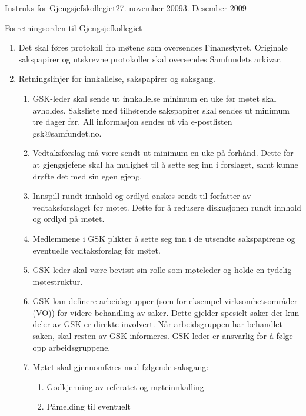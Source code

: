 \begin{instruks}{Instruks for Gjengsjefskollegiet}{27. november 2009}{3. Desember 2009}
\begin{instruksledd}{Forretningsorden til Gjengsjefkollegiet}
\begin{enumerate}
            \item Det skal føres protokoll fra møtene som oversendes Finansstyret. Originale
                sakspapirer og utskrevne
                protokoller skal oversendes Samfundets arkivar.
            \item Retningslinjer for innkallelse, sakspapirer og saksgang.
                \begin{enumerate}
                    \item GSK-leder skal sende ut innkallelse minimum en uke før møtet skal
                        avholdes. Saksliste med tilhørende
                        sakspapirer skal sendes ut minimum tre dager før. All informasjon sendes
                        ut via e-postlisten gsk@samfundet.no.
                    \item Vedtaksforslag må være sendt ut minimum en uke på forhånd. Dette for at
                        gjengsjefene skal ha mulighet
                        til å sette seg inn i forslaget, samt kunne drøfte det med sin egen gjeng.
                    \item Innspill rundt innhold og ordlyd
                        ønskes sendt til forfatter av vedtaksforslaget før møtet. Dette for å
                        redusere diskusjonen rundt innhold og
                        ordlyd på møtet.
                    \item Medlemmene i GSK plikter å sette seg inn i de utsendte sakspapirene og
                        eventuelle vedtaksforslag før
                        møtet.
                    \item GSK-leder skal være bevisst sin rolle som møteleder og holde en tydelig
                        møtestruktur.
                    \item GSK kan definere arbeidsgrupper (som for eksempel virksomhetsområder (VO))
                        for videre behandling
                        av saker. Dette gjelder spesielt saker der kun deler av GSK er direkte
                        involvert. Når arbeidsgruppen har
                        behandlet saken, skal resten av GSK informeres. GSK-leder er ansvarlig for
                        å følge opp
                        arbeidsgruppene.
                    \item Møtet skal gjennomføres med følgende saksgang:
                        \begin{enumerate}
                            \item Godkjenning av referatet og møteinnkalling
                            \item Påmelding til eventuelt

\end{enumerate}
\end{enumerate}
\end{enumerate}
\end{instruksledd}
\end{instruks}
